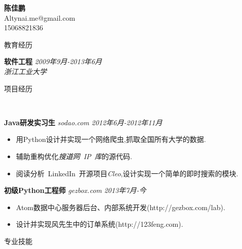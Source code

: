 ﻿\documentclass[9pt]{article}
\newenvironment{changemargin}[2]{%
  \begin{list}{}{%
    \setlength{\topsep}{0pt}%
    \setlength{\leftmargin}{#1}%
    \setlength{\rightmargin}{#2}%
    \setlength{\listparindent}{\parindent}%
    \setlength{\itemindent}{\parindent}%
    \setlength{\parsep}{\parskip}%
  }%
  \item[]}{\end{list}
}
\newcommand{\lineover}{
	\begin{changemargin}{-0.05in}{-0.05in}
		\vspace*{-8pt}
		\hrulefill \\
		\vspace*{-2pt}
	\end{changemargin}
}
\newcommand{\header}[1]{
	\begin{changemargin}{-0.5in}{-0.5in}
		\scshape{#1}\\
  	\lineover
	\end{changemargin}
}
\newcommand{\contact}[4]{
	\begin{changemargin}{-0.5in}{-0.5in}
		\begin{center}
			{\Large \scshape \textbf{#1}}\\ \smallskip
			{#2}\\ \smallskip
			{#3}\\ \smallskip
			{#4}\smallskip
		\end{center}
	\end{changemargin}
}
\newenvironment{body} {
	\vspace*{-16pt}
	\begin{changemargin}{-0.25in}{-0.5in}
  }	
	{\end{changemargin}
}
\begin{document}
\contact{陈佳鹏}{Altynai.me@gmail.com}{15068821836}

\header{教育经历}
\begin{body}
	\vspace{14pt}
	\textbf{软件工程} \hfill \emph{2009年9月-2013年6月} \\
	\emph{浙江工业大学}\\
\end{body}

\smallskip

\header{项目经历}

\begin{body}
	\vspace{14pt}

	\textbf{Java研发实习生} \emph{sodao.com} \hfill \emph{2012年6月-2012年11月}\\
	\vspace*{-4pt}
	\begin{itemize} \itemsep -0pt  %
		\item 用Python设计并实现一个网络爬虫,抓取全国所有大学的数据.
        \item 辅助重构优化\emph{搜道网~IP~库}的源代码.
        \item 阅读分析~LinkedIn~开源项目\emph{Cleo},设计实现一个简单的即时搜索的模块.
	\end{itemize}

    \textbf{初级Python工程师} \emph{gezbox.com} \hfill \emph{2013年7月-今}\\
    \vspace*{-4pt}
    \begin{itemize} \itemsep -0pt  %
        \item Atom数据中心服务器后台、内部系统开发(http://gezbox.com/lab).
        \item 设计并实现风先生中的订单系统(http://123feng.com).
    \end{itemize}

\end{body}

\smallskip


\header{专业技能}
\end{document}
